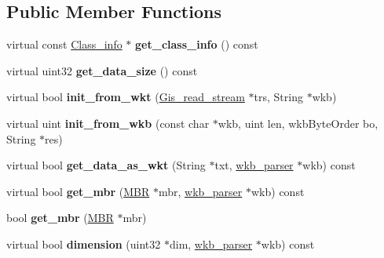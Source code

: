 \subsection*{Public Member Functions}
\begin{DoxyCompactItemize}
\item 
\mbox{\label{classGeometry_a545b424e3014a4dae01fff51011b304d}} 
virtual const \mbox{\hyperlink{classGeometry_1_1Class__info}{Class\+\_\+info}} $\ast$ {\bfseries get\+\_\+class\+\_\+info} () const
\item 
\mbox{\label{classGeometry_a14c4ea0a7e049577a88e34dbecb9f65c}} 
virtual uint32 {\bfseries get\+\_\+data\+\_\+size} () const
\item 
\mbox{\label{classGeometry_a287f5ec5411b90bf7cf1e7f6895c112b}} 
virtual bool {\bfseries init\+\_\+from\+\_\+wkt} (\mbox{\hyperlink{classGis__read__stream}{Gis\+\_\+read\+\_\+stream}} $\ast$trs, String $\ast$wkb)
\item 
\mbox{\label{classGeometry_a162ba71735e7b098d56d4e83704326b4}} 
virtual uint {\bfseries init\+\_\+from\+\_\+wkb} (const char $\ast$wkb, uint len, wkb\+Byte\+Order bo, String $\ast$res)
\item 
\mbox{\label{classGeometry_a02449917cbddb5b3730a9fabd7237e26}} 
virtual bool {\bfseries get\+\_\+data\+\_\+as\+\_\+wkt} (String $\ast$txt, \mbox{\hyperlink{classGeometry_1_1wkb__parser}{wkb\+\_\+parser}} $\ast$wkb) const
\item 
\mbox{\label{classGeometry_a5d53c2a3eba5b460c91aad300f9ff813}} 
virtual bool {\bfseries get\+\_\+mbr} (\mbox{\hyperlink{structMBR}{M\+BR}} $\ast$mbr, \mbox{\hyperlink{classGeometry_1_1wkb__parser}{wkb\+\_\+parser}} $\ast$wkb) const
\item 
\mbox{\label{classGeometry_aab7bd56424e48870b2765d552c5a01f2}} 
bool {\bfseries get\+\_\+mbr} (\mbox{\hyperlink{structMBR}{M\+BR}} $\ast$mbr)
\item 
\mbox{\label{classGeometry_aea918be253ffc8b0728063b1a715c026}} 
virtual bool {\bfseries dimension} (uint32 $\ast$dim, \mbox{\hyperlink{classGeometry_1_1wkb__parser}{wkb\+\_\+parser}} $\ast$wkb) const

\end{DoxyCompactItemize}
